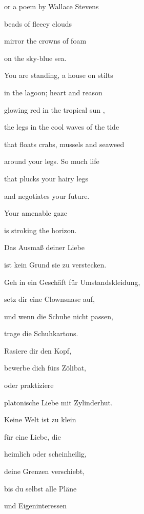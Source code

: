 \documentclass[a4paper]{article}
\begin{document}
or a poem by Wallace Stevens

beads of fleecy clouds 

mirror the crowns of foam

on the sky-blue sea.


\bigskip

You are standing, a house on stilts

in the lagoon; heart and reason

glowing red in the tropical sun ,

the legs in the cool waves of the tide

that floats crabs, mussels and seaweed


\bigskip

around your legs. So much life

that plucks your hairy legs

and negotiates your future.

Your amenable gaze

is stroking the horizon.


\bigskip



\bigskip


\bigskip

Das Ausmaß deiner Liebe 

ist kein Grund sie zu verstecken.


\bigskip

Geh in ein Geschäft für Umstandskleidung,

setz dir eine Clownsnase auf,

und wenn die Schuhe nicht passen,

trage die Schuhkartons.


\bigskip

Rasiere dir den Kopf,

bewerbe dich fürs Zölibat,

oder praktiziere

platonische Liebe mit Zylinderhut.


\bigskip

Keine Welt ist zu klein

für eine Liebe, die

heimlich oder scheinheilig,

deine Grenzen verschiebt,


\bigskip

bis du selbst alle Pläne

und Eigeninteressen
\end{document}
